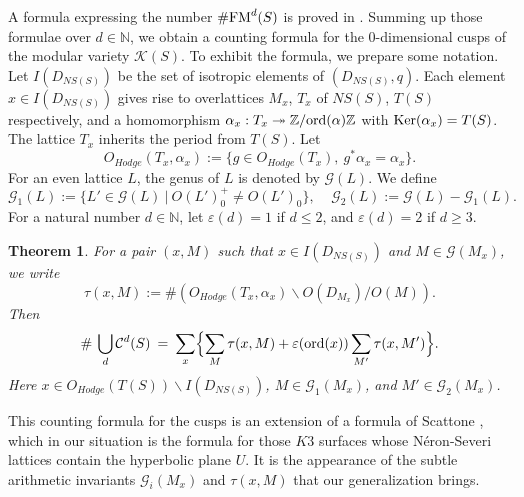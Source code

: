 \documentclass{article}
\theoremstyle{plain}
\newtheorem{theorem}{Theorem}[section]
\theoremstyle{definition}
\theoremstyle{remark}
\newcommand{\Z}{{\mathbb Z}}
\newcommand{\NN}{{\mathbb N}}
\begin{document}
A formula expressing the number $\# {\rm FM\/}^{d}(S)$ is proved in \cite{Ma2}. 
Summing up those formulae over $d \in {\NN}$,  
we obtain a counting formula 
for the $0$-dimensional cusps of the modular variety  $\mathcal{K}(S)$. 
To exhibit the formula, we prepare some notation.   
Let $I(D_{NS(S)})$ 
be the set of isotropic elements of $(D_{NS(S)}, q)$. 
Each element $x \in I(D_{NS(S)})$ 
gives rise to overlattices 
$M_{x}$, $T_{x}$ of $NS(S)$, $T(S)$ respectively, 
and a homomorphism 
$\alpha _{x} : T_{x} \twoheadrightarrow {\Z}/{\rm ord\/}(\alpha ) {\Z}$ 
with 
${\rm Ker\/}(\alpha _{x}) = T(S)$. 
The lattice $T_{x}$ inherits the period from $T(S)$. 
Let 
\begin{equation*}
O_{Hodge}(T_{x}, \alpha _{x}) := 
         \{ g \in O_{Hodge}(T_{x}), \: g^{\ast}\alpha _{x} = \alpha _{x} \} . 
\end{equation*}
For an even lattice $L$, 
the genus of $L$ is denoted by $\mathcal{G}(L)$. 
We define 
\begin{equation*}
\mathcal{G}_{1}(L) := \{ L'\in \mathcal{G}(L) \: |\: O(L')_{0}^{+} \ne O(L')_{0} \} , 
\: \: \: \: \: 
\mathcal{G}_{2}(L) := \mathcal{G}(L) - \mathcal{G}_{1}(L).
\end{equation*}
For a natural number $d \in {\NN}$, 
let 
$\varepsilon (d)=1$ if $d\leq 2$, 
and 
$\varepsilon (d)=2$ if $d\geq 3$. 





\begin{theorem}\label{number of cusps}
For a pair 
$(x, M)$ such that 
$x \in I(D_{NS(S)})$ and 
$M \in \mathcal{G}(M_{x})$, 
we write  
\begin{equation*}
\tau (x, M) := \# 
\left( 
O_{Hodge}(T_{x}, \alpha _{x}) \backslash O(D_{M_{x}}) /O(M) 
\right) . 
\end{equation*}
Then 
\begin{equation*}
\#  \: \mathop{\bigcup}_{d} \mathcal{C}^{d}(S)  
\: = \: 
\mathop{\sum}_{x} \Bigl\{ 
\mathop{\sum}_{M} \tau (x, M) + \varepsilon ({\rm ord\/}(x)) \mathop{\sum}_{M'} \tau (x, M')  \Bigr\} . 
\end{equation*}
Here 
$x \in O_{Hodge}(T(S)) \backslash I(D_{NS(S)})$, 
$M \in \mathcal{G}_{1}(M_{x})$, 
and 
$M' \in \mathcal{G}_{2}(M_{x})$. 
\end{theorem}


This counting formula for the cusps is an extension of a formula of Scattone \cite{Sc},     
which in our situation  
is the formula for those $K3$ surfaces whose N\'eron-Severi lattices contain the hyperbolic plane $U$.  
It is the appearance of the subtle arithmetic invariants  $\mathcal{G}_{i}(M_{x})$ and  $\tau (x, M)$ 
that our generalization brings.   
 
\end{document}
